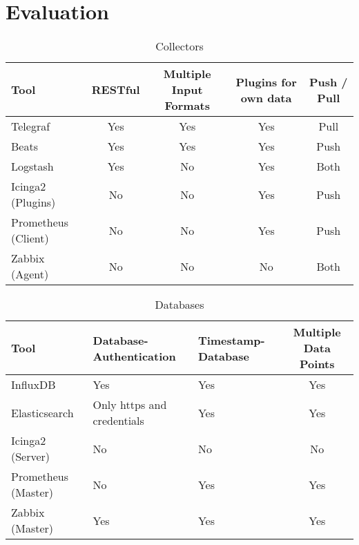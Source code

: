 \chapter{Evaluation} %
\begin{table}[]
\centering
\caption{Collectors}
\label{my-label}
\begin{tabular}{p{3cm}cccc}
\hline
Tool & RESTful                     & Multiple Input Formats      & Plugins for own data        & Push / Pull                  \\
\hline
Telegraf                     & Yes & Yes                         & Yes                         & Pull                         \\
Beats                        & Yes                         & Yes & Yes                         & Push                         \\
Logstash                     & Yes                         & No                          & Yes & Both                         \\
Icinga2 (Plugins)            & No                          & No                          & Yes                         & Push \\
Prometheus (Client)          & No                          & No                          & Yes                         & Push \\
Zabbix (Agent)               & No                          & No                          & No  & Both \\
\hline                        
\end{tabular}
\end{table}

\begin{table}[]
\centering
\caption{Databases}
\label{my-label}
\begin{tabular}{p{3cm}p{3cm}p{3cm}c}
	\hline
Tool & Database-Authentication     & Timestamp-Database          & Multiple Data Points        \\
\hline
InfluxDB                     & Yes & Yes                         & Yes                         \\
Elasticsearch                & Only https and credentials  & Yes & Yes                         \\
Icinga2 (Server)             & No                          & No                          & No                          \\
Prometheus (Master)          & No                          & Yes & Yes                         \\
Zabbix (Master)              & Yes                         & Yes                         & Yes\\
\hline
\end{tabular}
\end{table}

